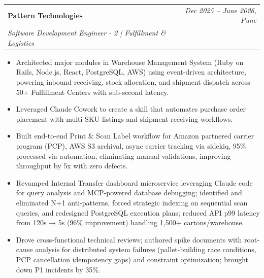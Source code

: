 \documentclass[a4paper,11pt]{article}
\makeatletter
\newcommand{\resumeSubheading}[4]{
\vspace{0.5mm}\item
    \begin{tabular*}{0.98\textwidth}[t]{l@{\extracolsep{\fill}}r}
        \textbf{#1} & \textit{\footnotesize{#4}} \\
        \textit{\footnotesize{#3}} &  \footnotesize{#2}\\
    \end{tabular*}
    \vspace{-2.4mm}
}
\newcommand{\resumeItemListStart}{\begin{justify}\begin{itemize}[leftmargin=3ex, rightmargin=2ex, noitemsep,labelsep=1.2mm,itemsep=0mm]\small}
\newcommand{\resumeItemListEnd}{\end{itemize}\end{justify}\vspace{-2mm}}
\makeatother
\begin{document}
    \resumeSubheading
      {Pattern Technologies}{}
      {Software Development Engineer - 2 | Fulfillment \& Logistics }{Dec 2025 -- June 2026, Pune}
      \vspace{-1.0mm}
      \resumeItemListStart
        \item Architected major modules in Warehouse Management System (Ruby on Rails, Node.js, React, PostgreSQL, AWS) using event-driven architecture, powering inbound receiving, stock allocation, and shipment dispatch across 50+ Fulfillment Centers with sub-second latency.
        \item Leveraged Claude Cowork to create a skill that automates purchase order placement with multi-SKU listings and shipment receiving workflows.
        \item Built end-to-end Print \& Scan Label workflow for Amazon partnered carrier program (PCP), AWS S3 archival, async carrier tracking via sidekiq, 95\% processed via automation, eliminating manual validations, improving throughput by 5x with zero defects.
        \item Revamped Internal Transfer dashboard microservice leveraging Claude code for query analysis and MCP-powered database debugging; identified and eliminated N+1 anti-patterns, forced strategic indexing on sequential scan queries, and redesigned PostgreSQL execution plans; reduced API p99 latency from 120s → 5s (96\% improvement) handling 1,500+ cartons/warehouse.
        \item Drove cross-functional technical reviews; authored spike documents with root-cause analysis for distributed system failures (pallet-building race conditions, PCP cancellation idempotency gaps) and constraint optimization; brought down P1 incidents by 35\%.
      \resumeItemListEnd
\end{document}
